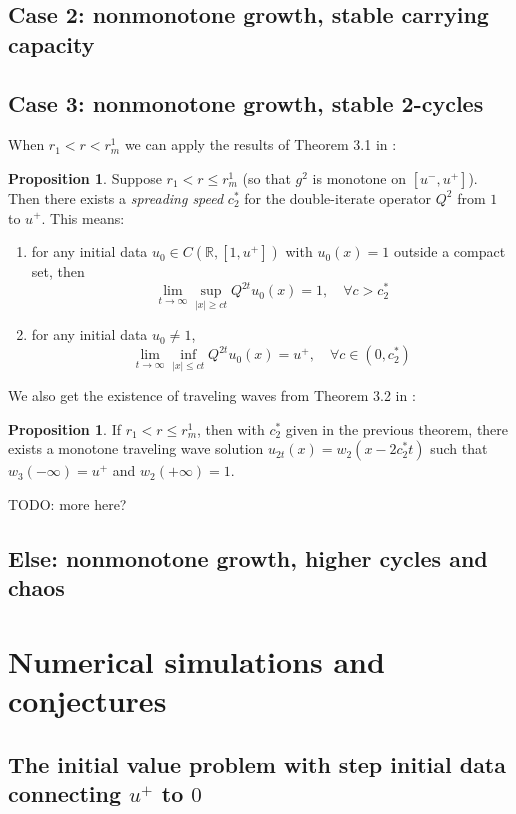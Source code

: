 \documentclass{article}
\theoremstyle{definition}
\newtheorem{proposition}[theorem]{Proposition}
\numberwithin{equation}{section}
\begin{document}
\subsection{Case 2: nonmonotone growth, stable carrying capacity}

\subsection{Case 3: nonmonotone growth, stable 2-cycles}

When $r_1 < r < r_m^1$ we can apply the results of Theorem 3.1 in \cite{BLL18}:

\begin{proposition}
Suppose $r_1 < r \leq r_m^1$ (so that $g^2$ is monotone on $[u^-,u^+]$). Then there exists a {\it spreading speed} $c_2^*$ for the double-iterate operator $Q^2$ from $1$ to $u^+$. This means:
\begin{enumerate}
\item for any initial data $u_0 \in C(\mathbb{R},[1,u^+])$ with $u_0(x)=1$ outside a compact set, then
$$ \lim_{t\to\infty} \sup_{|x| \geq ct} Q^{2t} u_0(x) = 1, \quad \forall c > c_2^* $$
\item for any initial data $u_0 \neq 1$,
$$ \lim_{t\to\infty} \inf_{|x| \leq ct} Q^{2t}u_0(x) = u^+, \quad \forall c \in (0,c_2^*) $$
\end{enumerate}
\end{proposition}

We also get the existence of traveling waves from Theorem 3.2 in \cite{BLL18}:

\begin{proposition}
If $r_1 < r \leq r_m^1$, then with $c_2^*$ given in the previous theorem, there exists a monotone traveling wave solution $u_{2t}(x)=w_2(x-2c_2^*t)$ such that $w_3(-\infty)=u^+$ and $w_2(+\infty)=1$.
\end{proposition}

TODO: more here?


\subsection{Else: nonmonotone growth, higher cycles and chaos}

\section{Numerical simulations and conjectures}

\subsection{The initial value problem with step initial data connecting $u^+$ to $0$}
\end{document}
